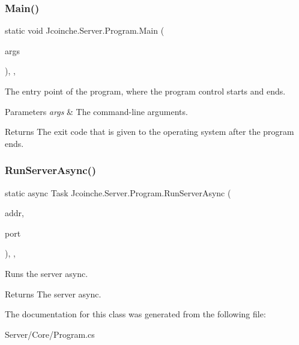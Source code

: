 \subsubsection{\texorpdfstring{Main()}{Main()}}
{\footnotesize\ttfamily static void Jcoinche.\+Server.\+Program.\+Main (\begin{DoxyParamCaption}\item[{String \mbox{[}$\,$\mbox{]}}]{args }\end{DoxyParamCaption})\hspace{0.3cm}{\ttfamily [inline]}, {\ttfamily [static]}, {\ttfamily [private]}}



The entry point of the program, where the program control starts and ends. 


\begin{DoxyParams}{Parameters}
{\em args} & The command-\/line arguments.\\
\hline
\end{DoxyParams}
\begin{DoxyReturn}{Returns}
The exit code that is given to the operating system after the program ends.
\end{DoxyReturn}
\mbox{\label{class_jcoinche_1_1_server_1_1_program_a02ccbf10fb4a4a1dee93783809a0a5f9}} 
\subsubsection{\texorpdfstring{Run\+Server\+Async()}{RunServerAsync()}}
{\footnotesize\ttfamily static async Task Jcoinche.\+Server.\+Program.\+Run\+Server\+Async (\begin{DoxyParamCaption}\item[{I\+P\+Address}]{addr,  }\item[{short}]{port }\end{DoxyParamCaption})\hspace{0.3cm}{\ttfamily [inline]}, {\ttfamily [static]}, {\ttfamily [private]}}



Runs the server async. 

\begin{DoxyReturn}{Returns}
The server async.
\end{DoxyReturn}


The documentation for this class was generated from the following file\+:\begin{DoxyCompactItemize}
\item 
Server/\+Core/Program.\+cs\end{DoxyCompactItemize}
